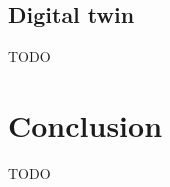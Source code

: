 \documentclass[conference]{IEEEtran}
\begin{document}
    \subsection{Digital twin}
    TODO

    \section{Conclusion}
    \label{section:conclusion}
    TODO
    
    
    
    
\end{document}
